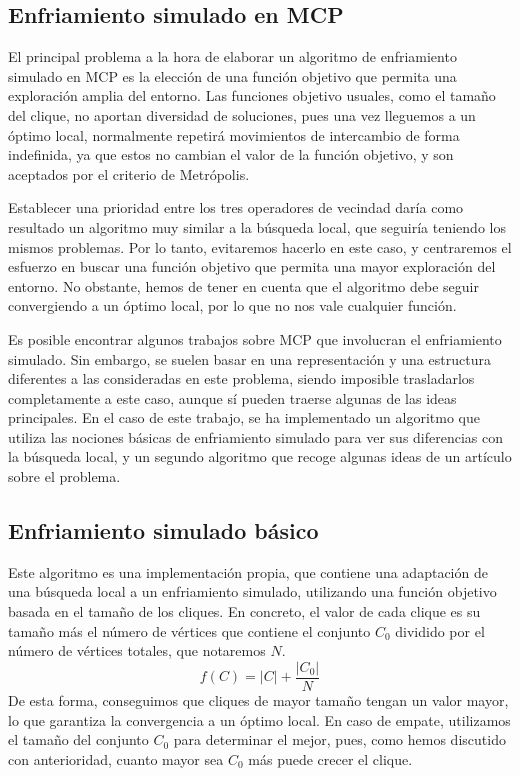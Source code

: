 \subsection{Enfriamiento simulado en MCP}

El principal problema a la hora de elaborar un algoritmo de enfriamiento simulado en MCP
es la elección de una función objetivo que permita una exploración amplia del entorno.
Las funciones objetivo usuales, como el tamaño del clique, no aportan diversidad de soluciones,
pues una vez lleguemos a un óptimo local, normalmente repetirá movimientos de intercambio
de forma indefinida, ya que estos no cambian el valor de la función objetivo, y son
aceptados por el criterio de Metrópolis.

Establecer una prioridad entre los tres operadores de vecindad daría como resultado un
algoritmo muy similar a la búsqueda local, que seguiría teniendo los mismos problemas.
Por lo tanto, evitaremos hacerlo en este caso, y centraremos el esfuerzo en buscar una
función objetivo que permita una mayor exploración del entorno. No obstante, hemos de
tener en cuenta que el algoritmo debe seguir convergiendo a un óptimo local, por lo que
no nos vale cualquier función.

Es posible encontrar algunos trabajos sobre MCP que involucran el enfriamiento simulado.
Sin embargo, se suelen basar en una representación y una estructura diferentes a las
consideradas en este problema, siendo imposible trasladarlos completamente a este caso,
aunque sí pueden traerse algunas de las ideas principales. En el caso de este trabajo,
se ha implementado un algoritmo que utiliza las nociones básicas de enfriamiento simulado
para ver sus diferencias con la búsqueda local, y un segundo algoritmo que recoge algunas
ideas de un artículo sobre el problema.

\subsection{Enfriamiento simulado básico}\label{enfriamiento1}

Este algoritmo es una implementación propia, que contiene una adaptación de una búsqueda
local a un enfriamiento simulado, utilizando una función objetivo basada en el tamaño de
los cliques. En concreto, el valor de cada clique es su tamaño más el número de vértices
que contiene el conjunto $C_0$ dividido por el número de vértices totales, que notaremos $N$.
\[ f(C) = |C| + \frac{|C_0|}{N} \]
De esta forma, conseguimos que cliques de mayor tamaño tengan un valor mayor,
lo que garantiza la convergencia a un óptimo local. En caso de empate, utilizamos
el tamaño del conjunto $C_0$ para determinar el mejor, pues, como hemos discutido
con anterioridad, cuanto mayor sea $C_0$ más puede crecer el clique.

